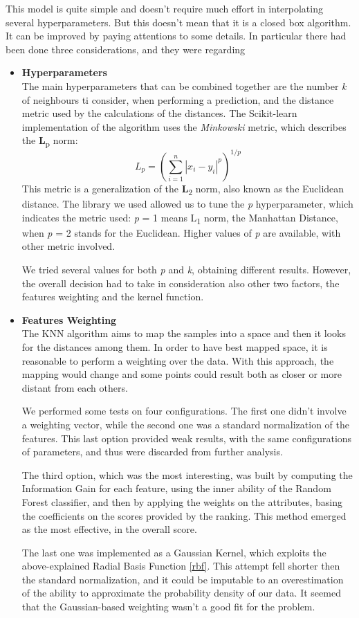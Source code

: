This model is quite simple and doesn't require much effort in interpolating several hyperparameters. But this doesn't mean that it is a closed box algorithm. It can be improved by paying attentions to some details. In particular there had been done three considerations, and they were regarding

\begin{itemize}
	\item[\PencilRight]\textbf{Hyperparameters}\\
	The main hyperparameters that can be combined together are the number \textit{k} of neighbours ti consider, when performing a prediction, and the distance metric used by the calculations of the distances.
	The Scikit-learn implementation of the algorithm uses the \textit{Minkowski} metric, which describes the \textbf{L}\textsubscript{p} norm: 
	\[ \mathit{L_{p}} = (\sum\limits_{i = 1}^{n}|x_{i} - y_{i}|^{p})^{1/p} \]
	This metric is a generalization of the \textbf{L}\textsubscript{2} norm, also known as the Euclidean distance.
	The library we used allowed us to tune the \textit{p} hyperparameter, which indicates the metric used: \textit{p} = 1 means L\textsubscript{1} norm, the Manhattan Distance, when \textit{p} = 2 stands for the Euclidean.
	Higher values of \textit{p} are available, with other metric involved.
	
	We tried several values for both \textit{p} and \textit{k}, obtaining different results.
	However, the overall decision had to take in consideration also other two factors, the features weighting and the kernel function.
	
	\item[\PencilRight]\textbf{Features Weighting}\\
	The KNN algorithm aims to map the samples into a space and then it looks for the distances among them. In order to have best mapped space, it is reasonable to perform a weighting over the data. With this approach, the mapping would change and some points could result both as closer or more distant from each others.
	
	We performed some tests on four configurations. The first one didn't involve a weighting vector, while the second one was a standard normalization of the features.
	This last option provided weak results, with the same configurations of parameters, and thus were discarded from further analysis.

	The third option, which was the most interesting, was built by computing the Information Gain for each feature, using the inner ability of the Random Forest classifier, and then by applying the weights on the attributes, basing the coefficients on the scores provided by the ranking.
	This method emerged as the most effective, in the overall score.
	
	The last one was implemented as a Gaussian Kernel, which exploits the above-explained Radial Basis Function \ref{rbf}.
	This attempt fell shorter then the standard normalization, and it could be imputable to an overestimation of the ability to approximate the probability density of our data.
	It seemed that the Gaussian-based weighting wasn't a good fit for the problem.
\end{itemize}

